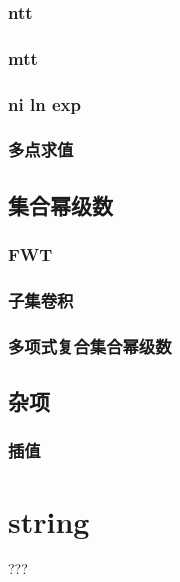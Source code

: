 \documentclass[12pt]{ctexart}
\begin{document}


\subsubsection{ntt}



\subsubsection{mtt}



\subsubsection{ni ln exp}



\subsubsection{多点求值}

\subsection{集合幂级数}

\subsubsection{FWT}

\subsubsection{子集卷积}

\subsubsection{多项式复合集合幂级数}

\subsection{杂项}

\subsubsection{插值}

\newpage

\section{string}

???
\end{document}
